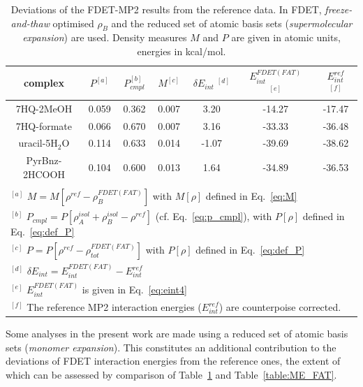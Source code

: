 \documentclass[amsmath,amssymb,preprint,aip,jcp]{revtex4-1}
\begin{document}
\begin{table}
{
\begin{center}
\begin{tabular}{|c|c|c|c|c|c|c|}
\hline
 complex & $P^{[a]}$ & $P_{cmpl}^{[b]}$ & $M^{[c]}$ & $\delta E_{int}\;^{[d]}$ & $E^{FDET(FAT)}_{int}$ $^{[e]}$ & $E_{int}^{ref}$ $^{[f]}$ \\ \hline
7HQ-2MeOH & 0.059 & 0.362 & 0.007 & 3.20 & -14.27 & -17.47 \\ \hline
7HQ-formate & 0.066 & 0.670 & 0.007 & 3.16 & -33.33 & -36.48 \\ \hline
uracil-5H$_2$O & 0.114 & 0.633 & 0.014 & -1.07 & -39.69 & -38.62 \\ \hline
PyrBnz-2HCOOH & 0.104 & 0.600 & 0.013 & 1.64 & -34.89 & -36.53 \\ \hline
\multicolumn{7}{c}{ } \\
\multicolumn{7}{l}{$^{[a]}$ $M=M[\rho^{ref} - \rho^{FDET(FAT)}_{B}]$ with $M[\rho]$ defined in Eq.~\ref{eq:M}}\\
\multicolumn{7}{l}{$^{[b]}$ $P_{cmpl}=P[\rho_A^{isol}+\rho_B^{isol} - \rho^{ref}]$ (cf. Eq.~\ref{eq:p_cmpl}), with $P[\rho]$ defined in Eq.~\ref{eq:def_P}}\\
\multicolumn{7}{l}{$^{[c]}$ $P=P[\rho^{ref} - \rho_{tot}^{FDET(FAT)}]$ with $P[\rho]$ defined in Eq.~\ref{eq:def_P}}\\
\multicolumn{7}{l}{$^{[d]}$ $\delta E_{int}=E^{FDET(FAT)}_{int}-E_{int}^{ref}$} \\
\multicolumn{7}{l}{$^{[e]}$ $E^{FDET(FAT)}_{int}$ is given in Eq.~\ref{eq:eint4}}\\
\multicolumn{7}{l}{$^{[f]}$ The reference MP2 interaction energies ($E_{int}^{ref}$) are counterpoise corrected.}
\end{tabular}
\end{center}
}%
\caption{Deviations of the FDET-MP2 results from the reference data. In FDET, \textit{freeze-and-thaw} optimised $\rho_B$ and the reduced set of atomic basis sets ({\it supermolecular expansion}) are used. 
Density measures $M$ and $P$ are given in atomic units, energies in kcal/mol.
}
\label{table:SE_FAT}
\end{table}

Some analyses in the present work are made using a reduced set of atomic basis sets ({\it monomer expansion}). This constitutes an additional contribution to the deviations of FDET interaction energies from the reference ones, the extent of which can be assessed by comparison of Table~\ref{table:SE_FAT} and Table~\ref{table:ME_FAT}.
\end{document}
